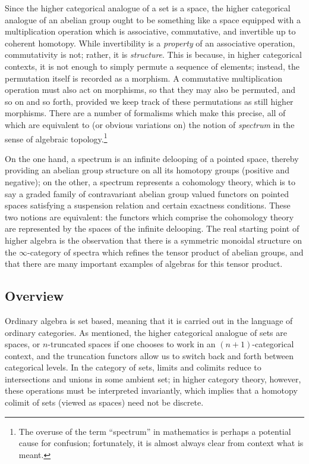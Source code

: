 \documentclass{article}
\theoremstyle{definition}
\renewcommand{\i}{\infty}
\begin{document}
Since the higher categorical analogue of a set is a space, the higher categorical analogue of an abelian group ought to be something like a space equipped with a multiplication operation which is associative, commutative, and invertible up to coherent homotopy.
While invertibility is a {\em property} of an associative operation, commutativity is not; rather, it is {\em structure}.
This is because, in higher categorical contexts, it is not enough to simply permute a sequence of elements; instead, the permutation itself is recorded as a morphism.
A commutative multiplication operation must also act on morphisms, so that they may also be permuted, and so on and so forth, provided we keep track of these permutations as still higher morphisms.
There are a number of formalisms which make this precise, all of which are equivalent to (or obvious variations on) the notion of {\em spectrum} in the sense of algebraic topology.\footnote{The overuse of the term ``spectrum'' in mathematics is perhaps a potential cause for confusion; fortunately, it is almost always clear from context what is meant.}


On the one hand, a spectrum is an infinite delooping of a pointed space, thereby providing an abelian group structure on all its homotopy groups (positive and negative); on the other, a spectrum represents a cohomology theory, which is to say a graded family of contravariant abelian group valued functors on pointed spaces satisfying a suspension relation and certain exactness conditions.  These two notions are equivalent: the  functors which comprise the cohomology theory are represented by the spaces of the infinite delooping.
The real starting point of higher algebra is the observation that there is a symmetric monoidal structure on the $\i$-category of spectra which refines the tensor product of abelian groups, and that there are many important examples of algebras for this tensor product.


\subsection{Overview}


Ordinary algebra is set based, meaning that it is carried out in the language of ordinary categories.
As mentioned, the higher categorical analogue of sets are spaces, or $n$-truncated spaces if one chooses to work in an $(n+1)$-categorical context, and the truncation functors allow us to switch back and forth between categorical levels.
In the category of sets, limits and colimits reduce to intersections and unions in some ambient set; in higher category theory, however, these operations must be interpreted invariantly, which implies that a homotopy colimit of sets (viewed as spaces) need not be discrete.
\end{document}
